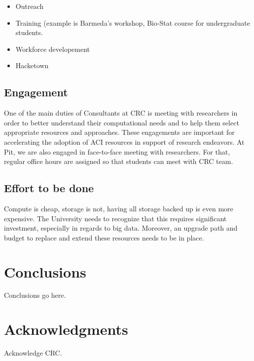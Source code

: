 \documentclass[conference]{IEEEtran}
\begin{document}
\begin{itemize}
\item Outreach
\item Training (example is Barmeda's workshop, Bio-Stat course for undergraduate students.
\item Workforce developement
\item Hacketown
\end{itemize}

\subsection{Engagement}
One of the main duties of Consultants at CRC is meeting with	researchers	in order to better	understand their computational needs and to help them select appropriate resources and approaches. These engagements are important for accelerating the adoption of ACI resources in support of research endeavors. At Pit, we are also engaged in face-to-face meeting with researchers. For that, regular office hours are assigned so that students can meet with CRC team.

\subsection{Effort to be done}
Compute is
cheap, storage is not, having all storage backed up is even more expensive. The University needs
to recognize that this requires significant investment, especially in regards to big data. Moreover,
an upgrade path and budget to replace and extend these resources needs to be in place.

\section{Conclusions}

Conclusions go here.

\section{Acknowledgments}
Acknowledge CRC.
%

 
\end{document}
